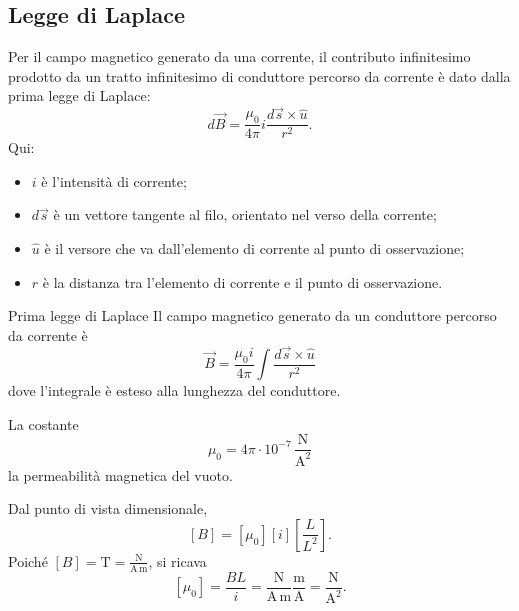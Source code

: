 \documentclass[a4paper]{article}
\begin{document}
\subsection{Legge di Laplace}

Per il campo magnetico generato da una corrente, il contributo infinitesimo prodotto da un tratto infinitesimo di conduttore percorso da corrente è dato dalla prima legge di Laplace:
\[
    d\vec{B} = \frac{\mu_0}{4\pi}i\frac{d\vec{s}\times\hat{u}}{r^2}.
\]
Qui:
\begin{itemize}
    \item \(i\) è l'intensità di corrente;
    \item \(d\vec{s}\) è un vettore tangente al filo, orientato nel verso della corrente;
    \item \(\hat{u}\) è il versore che va dall'elemento di corrente al punto di osservazione;
    \item \(r\) è la distanza tra l'elemento di corrente e il punto di osservazione.
\end{itemize}

\begin{snippettheorem}{Prima legge di Laplace}
    Il campo magnetico generato da un conduttore percorso da corrente è
    \[
        \vec{B}=\frac{\mu_0i}{4\pi}\int \frac{d\vec{s}\times\hat{u}}{r^2}
    \]
    dove l'integrale è esteso alla lunghezza del conduttore.
\end{snippettheorem}

La costante
\[
    \mu_0=4\pi\cdot 10^{-7}\,\frac{\mathrm{N}}{\mathrm{A}^2}
\]
la permeabilità magnetica del vuoto.

Dal punto di vista dimensionale,
\[
    [B] = [\mu_0][i]\left[\frac{L}{L^2}\right].
\]
Poiché \([B]=\mathrm{T}=\frac{\mathrm{N}}{\mathrm{A}\,\mathrm{m}}\), si ricava
\[
    [\mu_0]=\frac{B L}{i}
    =\frac{\mathrm{N}}{\mathrm{A}\,\mathrm{m}}\frac{\mathrm{m}}{\mathrm{A}}
    =\frac{\mathrm{N}}{\mathrm{A}^2}.
\]

\begin{center}
\end{center}
\end{document}
